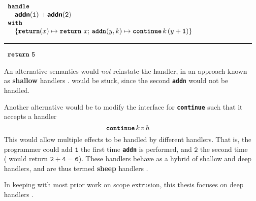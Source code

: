 \begin{enumerate}
         \begin{minipage}[t]{\linewidth}
          \centering
         \begin{efflst}
          $\begin{array}{l}
            \textbf{\texttt{handle}} \\
            \quad \textbf{\textsf{addn}}(\texttt{1}) + \textbf{\textsf{addn}}(\texttt{2}) \\
            \textbf{\texttt{with}} \\
            \quad \{ \textbf{\texttt{return}}(x) \mapsto {\texttt{\textbf{return}} \,\, {x}}; \, \textbf{\texttt{addn}}(y, k) \mapsto \textbf{\texttt{continue}} \, {k} \, {(y+\texttt{1})} \}\\
          \end{array}$
          \vspace{2mm} 
          \textcolor{effComment}{\hrule height 0.2mm \relax}
          \vspace{2mm} 
          
          \textcolor{effComment}{$\begin{array}{l}\texttt{\textbf{return}} \,\, {\texttt{5}}\end{array}$}
        \end{efflst}
        \centering
        \label{listing:eff-handler-type}
      \end{minipage}
      \par\vspace{0.6\baselineskip}
        An alternative semantics would \textit{not} reinstate the handler, in an approach known as \textbf{shallow} handlers \citep{hillestrom-2018}.  would be stuck, since the second \textbf{\texttt{addn}} would not be handled.

        Another alternative would be to modify the interface for \textbf{\texttt{continue}} such that it accepts a handler
        \[\textbf{\texttt{continue}} \, k \,  v \, h\]
        This would allow multiple effects to be handled by different handlers. That is, the programmer could add $\texttt{1}$ the first time \textbf{\texttt{addn}} is performed, and $\texttt{2}$ the second time ( would return $\texttt{2}+\texttt{4}=\texttt{6}$). These handlers behave as a hybrid of shallow and deep handlers, and are thus termed \textbf{sheep} handlers \citep{phipps-costin-2023}. 
         
        In keeping with most prior work on scope extrusion, this thesis focuses on deep handlers \citep{isoda-24}. 


\end{enumerate}

